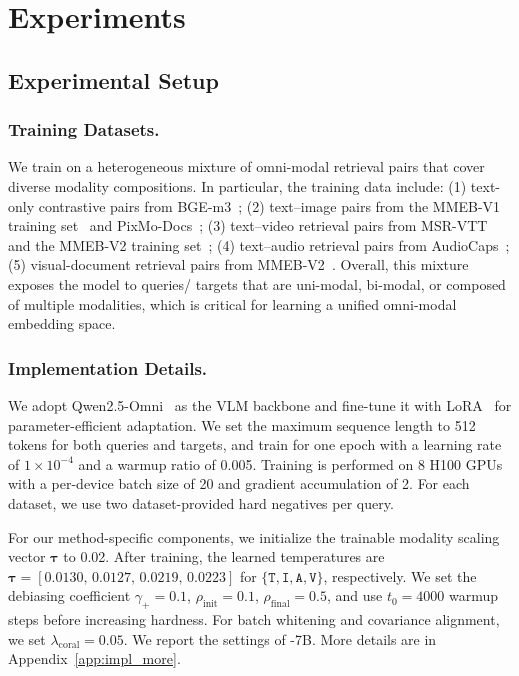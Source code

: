 





\section{Experiments}

\subsection{Experimental Setup}
\label{subsec:setup}

\subsubsection{Training Datasets.}

We train \ours{} on a heterogeneous mixture of omni-modal retrieval pairs that cover diverse modality compositions.
In particular, the training data include:
(1) text-only contrastive pairs from BGE-m3~\cite{bge-m3};
(2) text--image pairs from the MMEB-V1 training set~\cite{MMEB} and PixMo-Docs~\cite{PixMo};
(3) text--video retrieval pairs from MSR-VTT~\cite{MSR-VTT} and the MMEB-V2 training set~\cite{MMEB-v2};
(4) text--audio retrieval pairs from AudioCaps~\cite{AudioCaps};
(5) visual-document retrieval pairs from MMEB-V2~\cite{MMEB-v2}.
Overall, this mixture exposes the model to queries/ targets that are uni-modal, bi-modal, or composed of multiple modalities, which is critical for learning a unified omni-modal embedding space.

\subsubsection{Implementation Details.}
\label{subsubsec:imple_dets}

We adopt Qwen2.5-Omni~\cite{Qwen2.5-Omni} as the VLM backbone and fine-tune it with LoRA~\cite{lora} for parameter-efficient adaptation.
We set the maximum sequence length to 512 tokens for both queries and targets, and train for one epoch with a learning rate of $1\times 10^{-4}$ and a warmup ratio of 0.005.
Training is performed on 8 H100 GPUs with a per-device batch size of 20 and gradient accumulation of 2. 
For each dataset, we use two dataset-provided hard negatives per query.

For our method-specific components, we initialize the trainable modality scaling vector $\boldsymbol{\tau}$ to 0.02.
After training, the learned temperatures are
$\boldsymbol{\tau}=[0.0130,\,0.0127,\,0.0219,\,0.0223]$
for $\{\texttt{T},\texttt{I},\texttt{A},\texttt{V}\}$, respectively.
We set the debiasing coefficient $\gamma_{+} = 0.1$, $\rho_{\mathrm{init}}=0.1$, $\rho_{\mathrm{final}}=0.5$, and use $t_0=4000$ warmup steps before increasing hardness.
For batch whitening and covariance alignment, we set $\lambda_{\mathrm{coral}}=0.05$.
We report the settings of \ours{}-7B.
More details are in Appendix~\ref{app:impl_more}.

